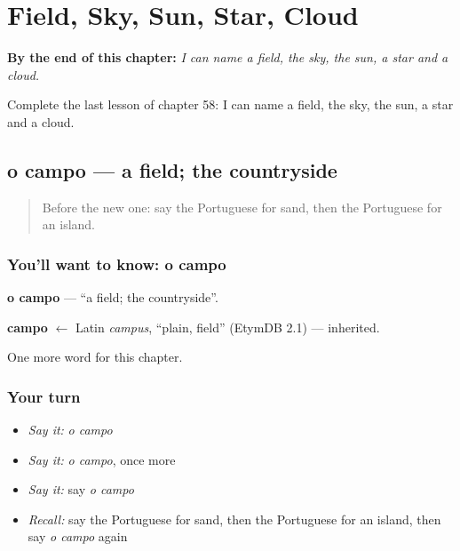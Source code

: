 
\chapter{Field, Sky, Sun, Star, Cloud}
\label{ch:pt-field-sky-sun-star-cloud}

\begin{chapteropening}
\textbf{By the end of this chapter:} \emph{I can name a field, the sky, the sun, a star and a cloud.}

Complete the last lesson of chapter 58: I can name a field, the sky, the sun, a star and a cloud.
\end{chapteropening}

\section[o campo]{o campo — a field; the countryside}

\label{lesson:PT-C58-campo}



\begin{quote}
Before the new one: say the Portuguese for sand, then the Portuguese for an island.
\end{quote}

\subsection*{You'll want to know: o campo}
\textbf{o campo} — \textquotedblleft{}a field; the countryside\textquotedblright{}.

\begin{cousinweb}
\textbf{campo} $\leftarrow$ Latin \emph{campus}, \textquotedblleft{}plain, field\textquotedblright{} (EtymDB 2.1) — inherited.
\end{cousinweb}

\begin{grammarlens}[title={What you've built}]
One more word for this chapter.
\end{grammarlens}

\subsection*{Your turn}
\begin{itemize}
\raggedright
  \item \emph{Say it:} \emph{o campo}
  \item \emph{Say it:} \emph{o campo}, once more
  \item \emph{Say it:} say \emph{o campo}
  \item \emph{Recall:} say the Portuguese for sand, then the Portuguese for an island, then say \emph{o campo} again
\end{itemize}

